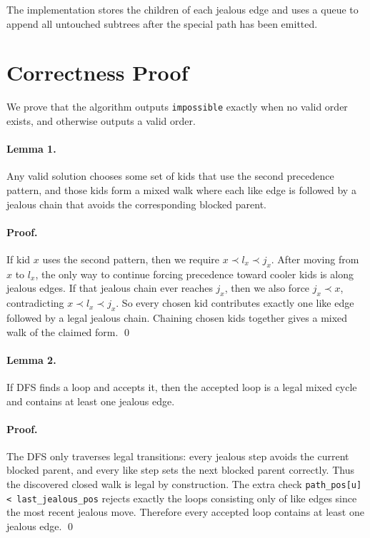 \documentclass[11pt]{article}
\begin{document}
The implementation stores the children of each jealous edge and uses a queue to append all untouched subtrees after the special path has been emitted.

\section*{Correctness Proof}

We prove that the algorithm outputs \texttt{impossible} exactly when no valid order exists, and otherwise outputs a valid order.

\paragraph{Lemma 1.}
Any valid solution chooses some set of kids that use the second precedence pattern, and those kids form a mixed walk where each like edge is followed by a jealous chain that avoids the corresponding blocked parent.

\paragraph{Proof.}
If kid $x$ uses the second pattern, then we require $x \prec l_x \prec j_x$. After moving from $x$ to $l_x$, the only way to continue forcing precedence toward cooler kids is along jealous edges. If that jealous chain ever reaches $j_x$, then we also force $j_x \prec x$, contradicting $x \prec l_x \prec j_x$. So every chosen kid contributes exactly one like edge followed by a legal jealous chain. Chaining chosen kids together gives a mixed walk of the claimed form. \qed

\paragraph{Lemma 2.}
If DFS finds a loop and accepts it, then the accepted loop is a legal mixed cycle and contains at least one jealous edge.

\paragraph{Proof.}
The DFS only traverses legal transitions: every jealous step avoids the current blocked parent, and every like step sets the next blocked parent correctly. Thus the discovered closed walk is legal by construction. The extra check
\texttt{path\_pos[u] < last\_jealous\_pos}
rejects exactly the loops consisting only of like edges since the most recent jealous move. Therefore every accepted loop contains at least one jealous edge. \qed
\end{document}
